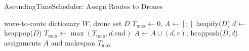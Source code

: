 \begin{algorithm}[H]
\caption{AscendingTimeScheduler: Assign Routes to Drones}
\label{alg:scheduler}
\begin{algorithmic}[1]
\Require wave-to-route dictionary $W$, drone set $D$
\State $T_{\max}\gets0$, $A\gets[;]$
\State heapify($D$) 
\State $d \gets$ heappop($D$)
\State {} 
\State $T_{\max}\gets\max(T_{\max}, d.\text{end})$
\State $A \gets A \cup {(d,r)}$; heappush($D,d$)
\EndFor
\EndFor
\State \Return assignments $A$ and makespan $T_{\max}$
\end{algorithmic}
\end{algorithm}